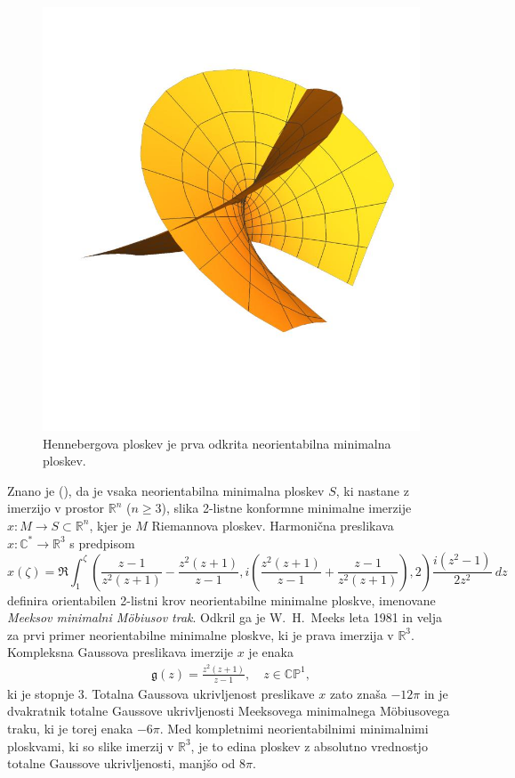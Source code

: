 \documentclass[12pt,a4paper,twoside]{article}
\theoremstyle{definition} %
\theoremstyle{plain} %
\numberwithin{equation}{section}  %
\newcommand{\R}{\mathbb R}
\newcommand{\C}{\mathbb C}
\begin{document}
\begin{figure}[h!]
\begin{center}
\includegraphics[scale=0.8]{images/henneberg.jpg}
\caption{Hennebergova ploskev je prva odkrita neorientabilna minimalna ploskev.}
\end{center}
\end{figure}

Znano je (\cite[Section~2.4]{alarcon2021minimal}), da je vsaka neorientabilna minimalna ploskev $S$, ki nastane z imerzijo v prostor $\R^{n}$ ($n \geq 3$), slika 2-listne konformne minimalne imerzije $x \colon M \to S \subset \R^{n}$, kjer je $M$ Riemannova ploskev.
Harmonična preslikava $x \colon \C^{*} \to \R^{3}$ s predpisom
\begin{equation*}
x(\zeta) = \Re \int_{1}^{\zeta} \left( \frac{z-1}{z^2(z+1)} - \frac{z^2(z+1)}{z-1}, i \left( \frac{z^2(z+1)}{z-1} + \frac{z-1}{z^2(z+1)} \right), 2 \right) \frac{i(z^2-1)}{2z^2} \ dz
\end{equation*}
definira orientabilen 2-listni krov neorientabilne minimalne ploskve, imenovane \emph{Meeksov minimalni M\"obiusov trak}. Odkril ga je W.~H.~Meeks leta 1981 in velja za prvi primer neorientabilne minimalne ploskve, ki je prava imerzija v $\R^{3}$. \newline
Kompleksna Gaussova preslikava imerzije $x$ je enaka
\begin{gather*}
\mathfrak{g}(z) = \frac{z^2(z+1)}{z-1}, \quad z \in \mathbb{CP}^1,
\end{gather*}
ki je stopnje $3$. Totalna Gaussova ukrivljenost preslikave $x$ zato znaša $-12 \pi$ in je dvakratnik totalne Gaussove ukrivljenosti Meeksovega minimalnega M\"obiusovega traku, ki je torej enaka $-6 \pi$.
Med kompletnimi neorientabilnimi minimalnimi ploskvami, ki so slike imerzij v $\R^3$, je to edina ploskev z absolutno vrednostjo totalne Gaussove ukrivljenosti, manjšo od $8 \pi$.
\end{document}
